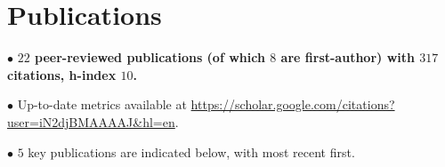 \documentclass[11pt,a4paper,sans]{moderncv} %
\begin{document}

\vspace{-2.5mm}
\section{Publications}

$\bullet$ \textbf{$22$ peer-reviewed publications (of which $8$ are first-author) with $317$ citations, h-index $10$.} 

$\bullet$ Up-to-date metrics available at \url{https://scholar.google.com/citations?user=iN2djBMAAAAJ&hl=en}.

$\bullet$ $5$ key publications are indicated below, with most recent first.
\vspace{1pt}
\end{document}
